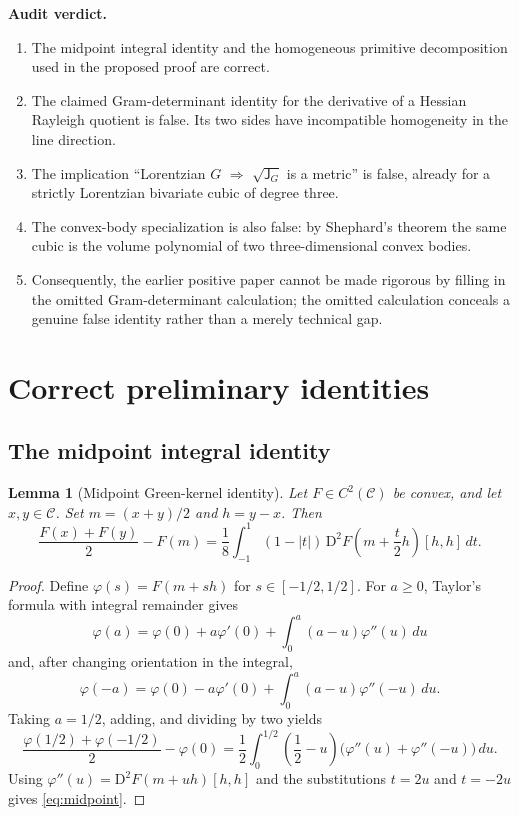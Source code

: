 \documentclass[11pt]{article}
\newtheorem{lemma}[theorem]{Lemma}
\theoremstyle{definition}
\newcommand{\C}{\mathcal{C}}
\newcommand{\J}{\mathsf{J}}
\newcommand{\D}{\mathrm{D}}
\begin{document}
\medskip
\noindent
\textbf{Audit verdict.}
\begin{enumerate}[label=\textup{(\roman*)},leftmargin=2.1em]
\item The midpoint integral identity and the homogeneous primitive decomposition used in the
      proposed proof are correct.
\item The claimed Gram-determinant identity for the derivative of a Hessian Rayleigh quotient
      is false.  Its two sides have incompatible homogeneity in the line direction.
\item The implication ``Lorentzian $G$ $\Rightarrow$ $\sqrt{\J_G}$ is a metric'' is false,
      already for a strictly Lorentzian bivariate cubic of degree three.
\item The convex-body specialization is also false: by Shephard's theorem the same cubic is
      the volume polynomial of two three-dimensional convex bodies.
\item Consequently, the earlier positive paper cannot be made rigorous by filling in the
      omitted Gram-determinant calculation; the omitted calculation conceals a genuine false
      identity rather than a merely technical gap.
\end{enumerate}

\section{Correct preliminary identities}

\subsection{The midpoint integral identity}

\begin{lemma}[Midpoint Green-kernel identity]\label{lem:midpoint}
Let $F\in C^2(\C)$ be convex, and let $x,y\in\C$.  Set
$m=(x+y)/2$ and $h=y-x$.  Then
\begin{equation}\label{eq:midpoint}
 \frac{F(x)+F(y)}2-F(m)
 =\frac18\int_{-1}^{1}(1-|t|)
   \,\D^2F\!\left(m+\frac{t}{2}h\right)[h,h] \,dt.
\end{equation}
\end{lemma}

\begin{proof}
Define $\varphi(s)=F(m+sh)$ for $s\in[-1/2,1/2]$.  For $a\ge0$,
Taylor's formula with integral remainder gives
\[
 \varphi(a)=\varphi(0)+a\varphi'(0)+\int_0^a(a-u)\varphi''(u)\,du
\]
and, after changing orientation in the integral,
\[
 \varphi(-a)=\varphi(0)-a\varphi'(0)+\int_0^a(a-u)\varphi''(-u)\,du.
\]
Taking $a=1/2$, adding, and dividing by two yields
\[
 \frac{\varphi(1/2)+\varphi(-1/2)}2-\varphi(0)
 =\frac12\int_0^{1/2}\left(\frac12-u\right)
   \bigl(\varphi''(u)+\varphi''(-u)\bigr)\,du.
\]
Using $\varphi''(u)=\D^2F(m+uh)[h,h]$ and the substitutions $t=2u$ and
$t=-2u$ gives \eqref{eq:midpoint}.
\end{proof}
\end{document}
